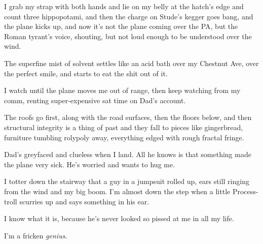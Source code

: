 I grab my strap with both hands and lie on my belly at the hatch's
edge and count three hippopotami, and then the charge on Stude's
kegger goes bang, and the plane kicks up, and now it's not the
plane coming over the PA, but the Roman tyrant's voice, shouting,
but not loud enough to be understood over the wind.

The superfine mist of solvent settles like an acid bath over my
Chestnut Ave, over the perfect smile, and starts to eat the shit
out of it.

I watch until the plane moves me out of range, then keep watching
from my comm, renting super-expensive sat time on Dad's account.

The roofs go first, along with the road surfaces, then the floors
below, and then structural integrity is a thing of past and they
fall to pieces like gingerbread, furniture tumbling rolypoly away,
everything edged with rough fractal fringe.

\tb

Dad's greyfaced and clueless when I land. All he knows is that
something made the plane very sick. He's worried and wants to hug
me.

I totter down the stairway that a guy in a jumpsuit rolled up, ears
still ringing from the wind and my big boom. I'm almost down the
step when a little Process-troll scurries up and says something in
his ear.

I know what it is, because he's never looked so pissed at me in all
my life.

I'm a fricken \emph{genius}.


